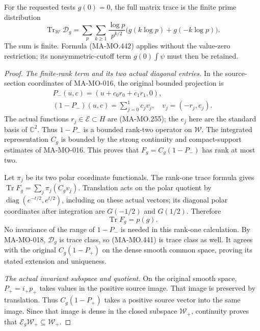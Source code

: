 For the requested tests \(g(0)=0\), the full matrix trace is
the finite prime distribution
\[
 \boxed{\displaystyle
 \operatorname{Tr}_{\mathcal W}\mathscr D_g
   =\sum_p\sum_{k\ge1}\frac{\log p}{p^{k/2}}
                       \bigl(g(k\log p)+g(-k\log p)\bigr).}
 \tag{MA-MO.444}
\]
The sum is finite. Formula (MA-MO.442) applies without the
value-zero restriction; its nonsymmetric-cutoff term
\(g(0)\int\psi\) must then be retained.

\begin{proof}
\emph{The finite-rank term and its two actual diagonal entries.}
In the source-section coordinates of MA-MO-016, the original
bounded projection is
\[
 \begin{gathered}
 P_-(u,c)=(u+c_0r_0+c_1r_1,0),\\
 (1-P_-)(u,c)=\sum_{j=0}^1c_jv_j,
 \quad v_j=(-r_j,e_j).
 \end{gathered}
 \tag{MA-MO.445}
\]
The actual functions \(r_j\in\mathcal E\subset H\) are
(MA-MO.255); the \(e_j\) here are the standard basis of
\(\mathbb C^2\). Thus \(1-P_-\) is a bounded rank-two
operator on \(\mathcal W\). The integrated representation
\(C_g\) is bounded by the strong continuity and compact-support
estimates of MA-MO-016. This proves that
\(F_g=C_g(1-P_-)\) has rank at most two.

Let \(\pi_j\) be its two polar coordinate functionals.
The rank-one trace formula gives
\(\operatorname{Tr}F_g=\sum_j\pi_j(C_gv_j)\).
Translation acts on the polar quotient by
\(\operatorname{diag}(e^{-t/2},e^{t/2})\), including on
these actual vectors; its diagonal polar coordinates after
integration are \(G(-1/2)\) and \(G(1/2)\). Therefore
\[
                         \operatorname{Tr}F_g=p(g).
 \tag{MA-MO.446}
\]
No invariance of the range of \(1-P_-\) is needed in this
rank-one calculation. By MA-MO-018, \(\mathscr D_g\) is
trace class, so (MA-MO.441) is trace class as well. It agrees
with the original \(C_g(1-P_+)\) on the dense smooth
common space, proving its stated extension and uniqueness.

\emph{The actual invariant subspace and quotient.}
On the original smooth space, \(P_+=i_+p_+\) takes values
in the positive source image. That image is preserved by
translation. Thus \(C_g(1-P_+)\) takes a positive source
vector into the same image. Since that image is dense in the
closed subspace \(\mathcal W_+\), continuity proves that
\(\mathscr E_g\mathcal W_+\subseteq\mathcal W_+\).


\end{proof}

